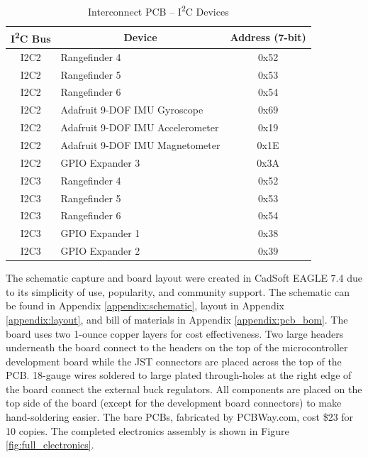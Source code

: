 \begin{table}[h]
	\centering	\caption{Interconnect PCB -- I\textsuperscript{2}C Devices}  \label{tab:i2c_table}
	\begin{tabular}{clc}
		\toprule 
		\multicolumn{1}{c}{I\textsuperscript{2}C Bus} & \multicolumn{1}{c}{Device} & Address (7-bit) \\ 
		\midrule 
		I2C2 & Rangefinder 4 & 0x52 \\  
		I2C2 & Rangefinder 5 & 0x53 \\  
		I2C2 & Rangefinder 6 & 0x54 \\  
		I2C2 & Adafruit 9-DOF IMU Gyroscope & 0x69 \\ 
		I2C2 & Adafruit 9-DOF IMU Accelerometer & 0x19\\ 		
		I2C2 & Adafruit 9-DOF IMU Magnetometer & 0x1E \\ 		
		I2C2 & GPIO Expander 3 & 0x3A \\ 				
		\hline
		I2C3 & Rangefinder 4 & 0x52 \\  
		I2C3 & Rangefinder 5 & 0x53 \\  
		I2C3 & Rangefinder 6 & 0x54 \\  
		I2C3 & GPIO Expander 1 & 0x38 \\ 				
		I2C3 & GPIO Expander 2 & 0x39 \\ 
		\bottomrule				
	\end{tabular} 
\end{table}

The schematic capture and board layout were created in CadSoft EAGLE 7.4 due to its simplicity of use, popularity, and community support. The schematic can be found in Appendix \ref{appendix:schematic}, layout in Appendix \ref{appendix:layout}, and bill of materials in Appendix  \ref{appendix:pcb_bom}. The board uses two 1-ounce copper layers for cost effectiveness. Two large headers underneath the board connect to the headers on the top of the microcontroller development board while the JST connectors are placed across the top of the PCB. 18-gauge wires soldered to large plated through-holes at the right edge of the board connect the external buck regulators. All components are placed on the top side of the board (except for the development board connectors) to make hand-soldering easier. The bare PCBs, fabricated by PCBWay.com, cost \$23 for 10 copies. The completed electronics assembly is shown in Figure \ref{fig:full_electronics}.

